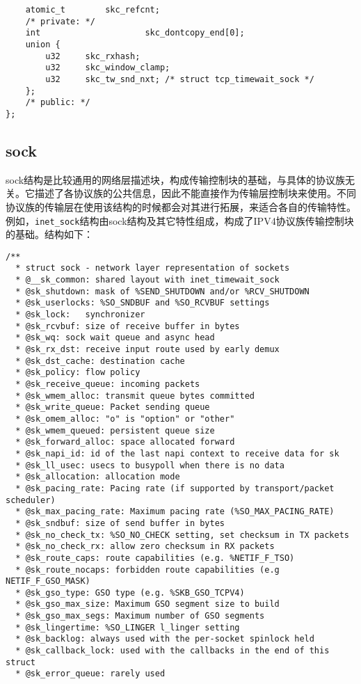 \begin{verbatim}
	atomic_t		skc_refcnt;
	/* private: */
	int                     skc_dontcopy_end[0];
	union {
		u32		skc_rxhash;
		u32		skc_window_clamp;
		u32		skc_tw_snd_nxt; /* struct tcp_timewait_sock */
	};
	/* public: */
};
\end{verbatim}
        \subsection{sock}
            sock结构是比较通用的网络层描述块，构成传输控制块的基础，与具体的协议族无关。它描述了各协议族的公共信息，因此不能直接作为传输层控制块来使用。不同协议族的传输层在使用该结构的时候都会对其进行拓展，来适合各自的传输特性。例如，\texttt{inet_sock}结构由sock结构及其它特性组成，构成了IPV4协议族传输控制块的基础。结构如下：

\begin{verbatim}
/**
  * struct sock - network layer representation of sockets
  * @__sk_common: shared layout with inet_timewait_sock
  * @sk_shutdown: mask of %SEND_SHUTDOWN and/or %RCV_SHUTDOWN
  * @sk_userlocks: %SO_SNDBUF and %SO_RCVBUF settings
  * @sk_lock:   synchronizer
  * @sk_rcvbuf: size of receive buffer in bytes
  * @sk_wq: sock wait queue and async head
  * @sk_rx_dst: receive input route used by early demux
  * @sk_dst_cache: destination cache
  * @sk_policy: flow policy
  * @sk_receive_queue: incoming packets
  * @sk_wmem_alloc: transmit queue bytes committed
  * @sk_write_queue: Packet sending queue
  * @sk_omem_alloc: "o" is "option" or "other"
  * @sk_wmem_queued: persistent queue size
  * @sk_forward_alloc: space allocated forward
  * @sk_napi_id: id of the last napi context to receive data for sk
  * @sk_ll_usec: usecs to busypoll when there is no data
  * @sk_allocation: allocation mode
  * @sk_pacing_rate: Pacing rate (if supported by transport/packet scheduler)
  * @sk_max_pacing_rate: Maximum pacing rate (%SO_MAX_PACING_RATE)
  * @sk_sndbuf: size of send buffer in bytes
  * @sk_no_check_tx: %SO_NO_CHECK setting, set checksum in TX packets
  * @sk_no_check_rx: allow zero checksum in RX packets
  * @sk_route_caps: route capabilities (e.g. %NETIF_F_TSO)
  * @sk_route_nocaps: forbidden route capabilities (e.g NETIF_F_GSO_MASK)
  * @sk_gso_type: GSO type (e.g. %SKB_GSO_TCPV4)
  * @sk_gso_max_size: Maximum GSO segment size to build
  * @sk_gso_max_segs: Maximum number of GSO segments
  * @sk_lingertime: %SO_LINGER l_linger setting
  * @sk_backlog: always used with the per-socket spinlock held
  * @sk_callback_lock: used with the callbacks in the end of this struct
  * @sk_error_queue: rarely used

\end{verbatim}
